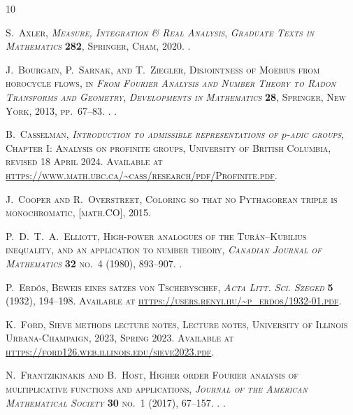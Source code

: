 \documentclass[twoside]{aomart}
\theoremstyle{paperplain}
\theoremstyle{paperdefinition}
\numberwithin{equation}{section}
\begin{document}
\begin{thebibliography}{10}
\footnotesize

\bgroup\scshape{}S.~Axler\egroup{},
  \emph{Measure, Integration \& Real Analysis},
  \emph{Graduate Texts in Mathematics} \textbf{282},
  Springer, Cham, 2020. .

\bgroup\scshape{}J.~Bourgain\egroup{}, \bgroup\scshape{}P.~Sarnak\egroup{}, and
  \bgroup\scshape{}T.~Ziegler\egroup{}, Disjointness of {M}oebius from
  horocycle flows,  in \emph{From Fourier Analysis and Number Theory to Radon
  Transforms and Geometry}, \emph{Developments in Mathematics} \textbf{28},
  Springer, New York, 2013, pp.~67--83. .
  .

\bgroup\scshape{}B.~Casselman\egroup{},
  \emph{Introduction to admissible representations of $p$-adic groups},
  Chapter I: Analysis on profinite groups, University of British Columbia,
  revised 18 April 2024. Available at
  \url{https://www.math.ubc.ca/~cass/research/pdf/Profinite.pdf}.

\bgroup\scshape{}J.~Cooper\egroup{} and \bgroup\scshape{}R.~Overstreet\egroup{},
  Coloring so that no {P}ythagorean triple is monochromatic,  [math.CO], 2015.

\bgroup\scshape{}P.~D.~T.~A.~Elliott\egroup{}, High-power analogues of the
  {T}ur{\'a}n--{K}ubilius inequality, and an application to number theory,
  \emph{Canadian Journal of Mathematics} \textbf{32} no.~4 (1980), 893--907.
  .

\bgroup\scshape{}P.~Erd{\H{o}}s\egroup{}, Beweis eines satzes von
  {T}schebyschef,  \emph{Acta Litt. Sci. Szeged} \textbf{5} (1932), 194--198.
  Available at \url{https://users.renyi.hu/~p_erdos/1932-01.pdf}.

\bgroup\scshape{}K.~Ford\egroup{}, Sieve methods lecture notes, Lecture notes,
  University of Illinois Urbana-Champaign, 2023, Spring 2023. Available at
  \url{https://ford126.web.illinois.edu/sieve2023.pdf}.

\bgroup\scshape{}N.~Frantzikinakis\egroup{} and
  \bgroup\scshape{}B.~Host\egroup{}, Higher order {Fourier} analysis of
  multiplicative functions and applications,  \emph{Journal of the American
  Mathematical Society} \textbf{30} no.~1 (2017), 67--157. .
   .


\end{thebibliography}
\end{document}
